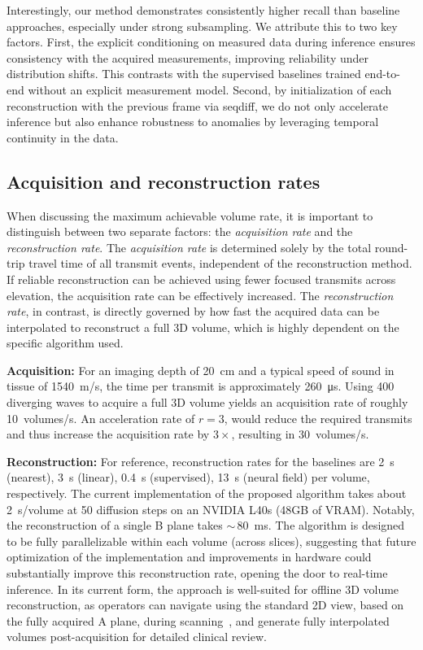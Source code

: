 \documentclass[journal,twoside,web,dvipsnames]{ieeecolor}          %
\begin{document}
Interestingly, our method demonstrates consistently higher recall than baseline approaches, especially under strong subsampling. We attribute this to two key factors. First, the explicit conditioning on measured data during inference ensures consistency with the acquired measurements, improving reliability under distribution shifts. This contrasts with the supervised baselines trained end-to-end without an explicit measurement model. Second, by initialization of each reconstruction with the previous frame via \acrshort{seqdiff}, we do not only accelerate inference but also enhance robustness to anomalies by leveraging temporal continuity in the data.

\subsection{Acquisition and reconstruction rates}
\label{sec:speed}
When discussing the maximum achievable volume rate, it is important to distinguish between two separate factors: the \emph{acquisition rate} and the \emph{reconstruction rate}. The \emph{acquisition rate} is determined solely by the total round-trip travel time of all transmit events, independent of the reconstruction method. If reliable reconstruction can be achieved using fewer focused transmits across elevation, the acquisition rate can be effectively increased. The \emph{reconstruction rate}, in contrast, is directly governed by how fast the acquired data can be interpolated to reconstruct a full 3D volume, which is highly dependent on the specific algorithm used.

\textbf{Acquisition:}
For an imaging depth of \SI{20}{\centi\metre} and a typical speed of sound in tissue of \SI{1540}{\metre/\second}, the time per transmit is approximately \SI{260}{\micro\second}. Using 400 diverging waves to acquire a full 3D volume yields an acquisition rate of roughly \SI{10}{volumes/\second}. An acceleration rate of $r=3$, would reduce the required transmits and thus increase the acquisition rate by $3\times$, resulting in \SI{30}{volumes/\second}.

\textbf{Reconstruction:}
For reference, reconstruction rates for the baselines are \SI{2}{\second} (nearest), \SI{3}{\second} (linear), \SI{0.4}{\second} (supervised), \SI{13}{\second} (neural field) per volume, respectively.
The current implementation of the proposed algorithm takes about \SI{2}{\second/volume} at 50 diffusion steps on an NVIDIA L40s (48GB of VRAM). Notably, the reconstruction of a single B plane takes \mbox{$\sim\,$\SI{80}{\milli\second}}. The algorithm is designed to be fully parallelizable within each volume (across slices), suggesting that future optimization of the implementation and improvements in hardware could substantially improve this reconstruction rate, opening the door to real-time inference. In its current form, the approach is well-suited for offline 3D volume reconstruction, as operators can navigate using the standard 2D view, based on the fully acquired A plane, during scanning~\cite{huang2017review}, and generate fully interpolated volumes post-acquisition for detailed clinical review.
\end{document}
